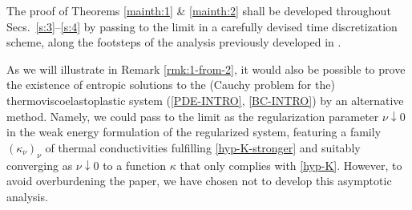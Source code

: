 \documentclass[a4paper,10pt,reqno]{amsart}
\numberwithin{equation}{section}
\numberwithin{equation}{section}
\newcommand{\down}{\downarrow}
\newcommand{\condu}{\kappa}
\begin{document}
\par
 The proof of Theorems  \ref{mainth:1} \&   \ref{mainth:2}
 shall be developed throughout Secs.\ \ref{s:3}--\ref{s:4} by passing to the limit in a carefully devised time discretization scheme,
 along the footsteps of the analysis previously developed in \cite{Rocca-Rossi, Rossi2016}.
 \par
 As we will illustrate in Remark \ref{rmk:1-from-2}, it would also be possible to prove the existence of entropic solutions to the  (Cauchy problem for the) thermoviscoelastoplastic system (\ref{PDE-INTRO}, \ref{BC-INTRO})  by an alternative method. Namely, we could pass to the limit  as the  regularization parameter $\nu \downarrow 0$ in the weak energy formulation of the regularized system, featuring a family $(\condu_\nu)_\nu$ of thermal conductivities
 fulfilling \eqref{hyp-K-stronger} and 
  suitably converging as $\nu \down 0$ to a function $\condu$ that only complies with  \eqref{hyp-K}. However,
 to avoid overburdening the paper,
  we have chosen not to develop this asymptotic analysis. %
\end{document}
